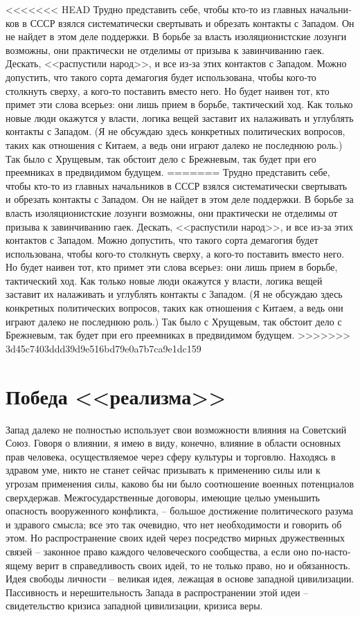 \documentclass{book}
\begin{document}
{<<<<<<< HEAD
Трудно представить себе, чтобы кто‑то из главных начальни­ков в СССР взялся систематически свертывать и обрезать кон­такты с Западом. Он не найдет в этом деле поддержки. В борь­бе за власть изоляционистские лозунги возможны, они прак­тически не отделимы от призыва к завинчиванию гаек. Дескать, <<распустили народ>>, и все из‑за этих контактов с Западом. Можно допустить, что такого сорта демагогия будет использована, чтобы кого‑то столкнуть сверху, а кого‑то поставить вместо него. Но будет наивен тот, кто примет эти слова все­рьез: они лишь прием в борьбе, тактический ход. Как только новые люди окажутся у власти, логика вещей заставит их нала­живать и углублять контакты с Западом. (Я не обсуждаю здесь конкретных политических вопросов, таких как отношения с Китаем, а ведь они играют далеко не последнюю роль.) Так бы­ло с Хрущевым, так обстоит дело с Брежневым, так будет при его преемниках в предвидимом будущем.
=======
Трудно представить себе, чтобы кто-то из главных начальни­ков в СССР взялся систематически свертывать и обрезать кон­такты с Западом. Он не найдет в этом деле поддержки. В борь­бе за власть изоляционистские лозунги возможны, они прак­тически не отделимы от призыва к завинчиванию гаек. Дескать, <<распустили народ>>, и все из-за этих контактов с Западом. Можно допустить, что такого сорта демагогия будет использована, чтобы кого-то столкнуть сверху, а кого-то поставить вместо него. Но будет наивен тот, кто примет эти слова все­рьез: они лишь прием в борьбе, тактический ход. Как только новые люди окажутся у власти, логика вещей заставит их нала­живать и углублять контакты с Западом. (Я не обсуждаю здесь конкретных политических вопросов, таких как отношения с Китаем, а ведь они играют далеко не последнюю роль.) Так бы­ло с Хрущевым, так обстоит дело с Брежневым, так будет при его преемниках в предвидимом будущем.
>>>>>>> 3d45c7403ddd39d9e516bd79e0a7b7ca9e1dc159


\section{Победа <<реализма>>}

Запад далеко не полностью использует свои возможности влияния на Советский Союз. Говоря о влиянии, я имею в виду, конечно, влияние в области основных прав человека, осуще­ствляемое через сферу культуры и торговлю. Находясь в здра­вом уме, никто не станет сейчас призывать к применению силы или к угрозам применения силы, каково бы ни было соотно­шение военных потенциалов сверхдержав. Межгосударствен­ные договоры, имеющие целью уменьшить опасность воору­женного конфликта, -- большое достижение политического ра­зума и здравого смысла; все это так очевидно, что нет необ­ходимости и говорить об этом. Но распространение своих идей через посредство мирных дружественных связей -- законное право каждого человеческого сообщества, а если оно по-насто­ящему верит в справедливость своих идей, то не только право, но и обязанность. Идея свободы личности -- великая идея, ле­жащая в основе западной цивилизации. Пассивность и нереши­тельность Запада в распространении этой идеи -- свидетельство кризиса западной цивилизации, 
кризиса веры.

}
\end{document}
